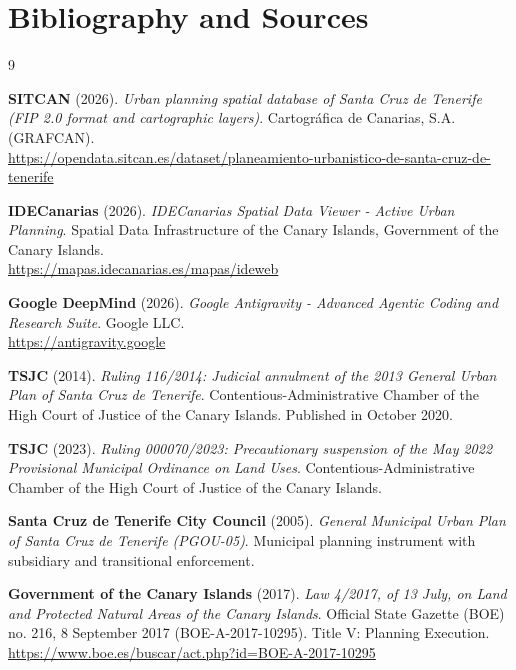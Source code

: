\section{Bibliography and Sources}

\begin{thebibliography}{9}
\sloppy

\textbf{SITCAN} (2026). \emph{Urban planning spatial database of Santa Cruz de Tenerife (FIP 2.0 format and cartographic layers)}. Cartográfica de Canarias, S.A. (GRAFCAN). \\
\url{https://opendata.sitcan.es/dataset/planeamiento-urbanistico-de-santa-cruz-de-tenerife}

\textbf{IDECanarias} (2026). \emph{IDECanarias Spatial Data Viewer - Active Urban Planning}. Spatial Data Infrastructure of the Canary Islands, Government of the Canary Islands. \\
\url{https://mapas.idecanarias.es/mapas/ideweb}

\textbf{Google DeepMind} (2026). \emph{Google Antigravity - Advanced Agentic Coding and Research Suite}. Google LLC. \\
\url{https://antigravity.google}

\textbf{TSJC} (2014). \emph{Ruling 116/2014: Judicial annulment of the 2013 General Urban Plan of Santa Cruz de Tenerife}. Contentious-Administrative Chamber of the High Court of Justice of the Canary Islands. Published in October 2020.

\textbf{TSJC} (2023). \emph{Ruling 000070/2023: Precautionary suspension of the May 2022 Provisional Municipal Ordinance on Land Uses}. Contentious-Administrative Chamber of the High Court of Justice of the Canary Islands.

\textbf{Santa Cruz de Tenerife City Council} (2005). \emph{General Municipal Urban Plan of Santa Cruz de Tenerife (PGOU-05)}. Municipal planning instrument with subsidiary and transitional enforcement.

\textbf{Government of the Canary Islands} (2017). \emph{Law 4/2017, of 13 July, on Land and Protected Natural Areas of the Canary Islands}. Official State Gazette (BOE) no. 216, 8 September 2017 (BOE-A-2017-10295). Title V: Planning Execution. \\
\url{https://www.boe.es/buscar/act.php?id=BOE-A-2017-10295}

\end{thebibliography}
